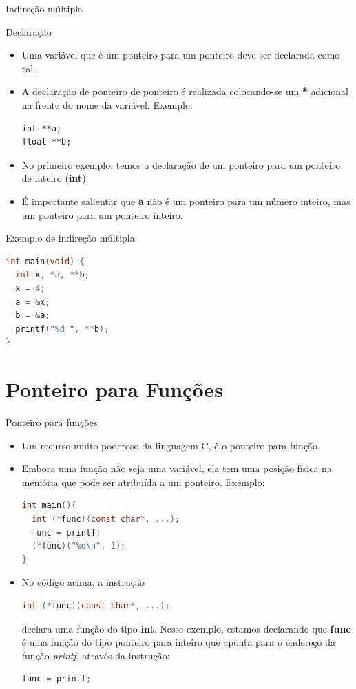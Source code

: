 \begin{frame}[fragile,c]{Indireção múltipla}
\begin{block}{Declaração}
  \begin{itemize}[<+->]
    \item Uma variável que é um ponteiro para um ponteiro deve ser declarada como tal.
    \item A declaração de ponteiro de ponteiro é realizada colocando-se um \textbf{*} adicional na frente do nome da variável. Exemplo:   
\begin{lstlisting}
int **a;
float **b;
\end{lstlisting}
  \item No primeiro exemplo, temos a declaração de um ponteiro para um ponteiro de inteiro (\textbf{int}). 
  \item \alert{É importante salientar que \textbf{a} não é um ponteiro para um número inteiro, mas um ponteiro para um ponteiro inteiro.}
  \end{itemize}
\end{block}    
\end{frame}

\begin{frame}[fragile,c]{Exemplo de indireção múltipla}
\begin{lstlisting}[language=C]
int main(void) {
  int x, *a, **b;
  x = 4;
  a = &x;
  b = &a;
  printf("%d ", **b);
}
\end{lstlisting}
\end{frame}


\section{Ponteiro para Funções}
\begin{frame}[fragile,c]{Ponteiro para funções}
  \begin{itemize}[<+->]
    \item Um recurso muito poderoso da linguagem C, é o ponteiro para função.
    \item Embora uma função não seja uma variável, ela tem uma posição física na memória que pode ser atribuída a um ponteiro. Exemplo:
\begin{lstlisting}[language=C]
int main(){
  int (*func)(const char*, ...);
  func = printf;
  (*func)("%d\n", 1);
}
\end{lstlisting}
 \item No código acima, a instrução
\begin{lstlisting}[language=C]
 int (*func)(const char*, ...);
\end{lstlisting} 
declara uma função do tipo \textbf{int}. Nesse exemplo, estamos declarando que \textbf{func} é uma função do tipo ponteiro para inteiro que aponta para o endereço da função \textit{printf}, através da instrução: 
\begin{lstlisting}[language=C]
 func = printf;
\end{lstlisting}
\end{itemize}
\end{frame}

